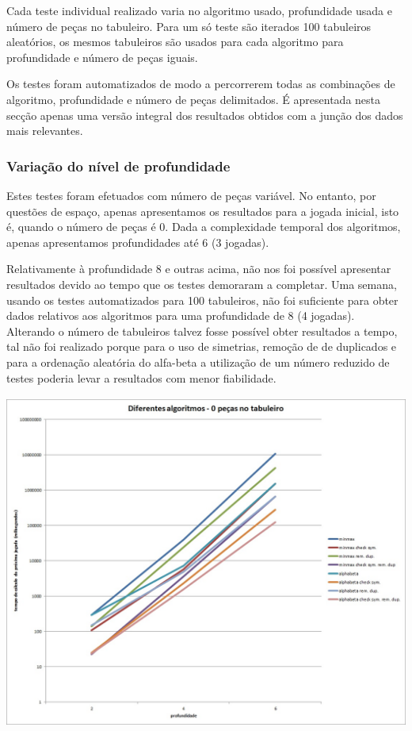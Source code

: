 Cada teste individual realizado varia no algoritmo usado, profundidade usada e número de peças no tabuleiro. Para um só teste são iterados 100 tabuleiros aleatórios, os mesmos tabuleiros são usados para cada algoritmo para profundidade e número de peças iguais.

Os testes foram automatizados de modo a percorrerem todas as combinações de algoritmo, profundidade e número de peças delimitados. É apresentada nesta secç\~ao apenas uma versão integral dos resultados obtidos com a junção dos dados mais relevantes.

\subsubsection{Variação do nível de profundidade}

Estes testes foram efetuados com número de peças variável. No entanto, por questões de espaço, apenas apresentamos os resultados para a jogada inicial, isto é, quando o número de peças é 0. Dada a complexidade temporal dos algoritmos, apenas apresentamos profundidades até 6 (3 jogadas).

Relativamente à profundidade 8 e outras acima, n\~ao nos foi possível apresentar resultados devido ao tempo que os testes demoraram a completar. Uma semana, usando os testes automatizados para 100 tabuleiros, não foi suficiente para obter dados relativos aos algoritmos para uma profundidade de 8 (4 jogadas). Alterando o número de tabuleiros talvez fosse possível obter resultados a tempo, tal n\~ao foi realizado porque para o uso de simetrias, remoção de de duplicados e para a ordenação aleatória do alfa-beta a utilização de um número reduzido de testes poderia levar a resultados com menor fiabilidade.

\begin{table}[H]
\centering
\includegraphics[height=11cm]{performance/tempP0depthComparison.jpg}
\end{table}

